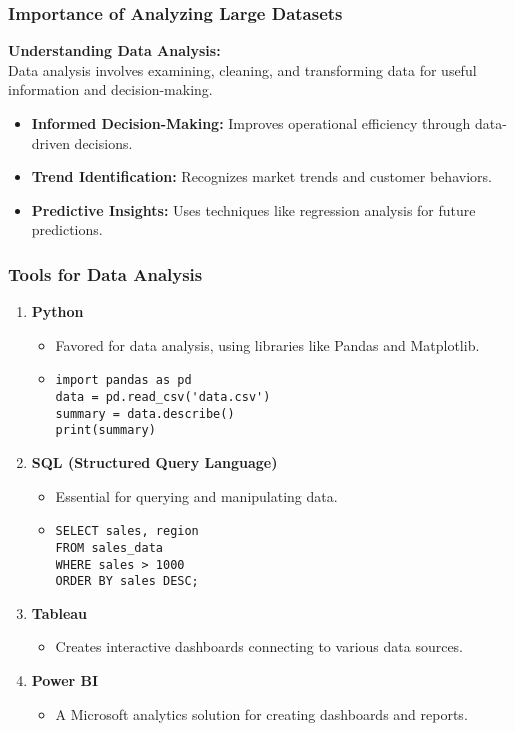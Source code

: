 \documentclass{beamer}
\begin{document}
\begin{frame}
    \frametitle{Importance of Analyzing Large Datasets}
    \textbf{Understanding Data Analysis:} \\
    Data analysis involves examining, cleaning, and transforming data for useful information and decision-making.

    \begin{itemize}
        \item \textbf{Informed Decision-Making:} Improves operational efficiency through data-driven decisions.
        \item \textbf{Trend Identification:} Recognizes market trends and customer behaviors.
        \item \textbf{Predictive Insights:} Uses techniques like regression analysis for future predictions.
    \end{itemize}
\end{frame}

\begin{frame}[fragile]
    \frametitle{Tools for Data Analysis}
    \begin{enumerate}
        \item \textbf{Python}
        \begin{itemize}
            \item Favored for data analysis, using libraries like Pandas and Matplotlib.
            \item \begin{lstlisting}
import pandas as pd
data = pd.read_csv('data.csv')
summary = data.describe()
print(summary)
            \end{lstlisting}
        \end{itemize}

        \item \textbf{SQL (Structured Query Language)}
        \begin{itemize}
            \item Essential for querying and manipulating data.
            \item \begin{lstlisting}
SELECT sales, region
FROM sales_data
WHERE sales > 1000
ORDER BY sales DESC;
            \end{lstlisting}
        \end{itemize}

        \item \textbf{Tableau}
        \begin{itemize}
            \item Creates interactive dashboards connecting to various data sources.
        \end{itemize}

        \item \textbf{Power BI}
        \begin{itemize}
            \item A Microsoft analytics solution for creating dashboards and reports.
        \end{itemize}
    \end{enumerate}
\end{frame}
\end{document}
